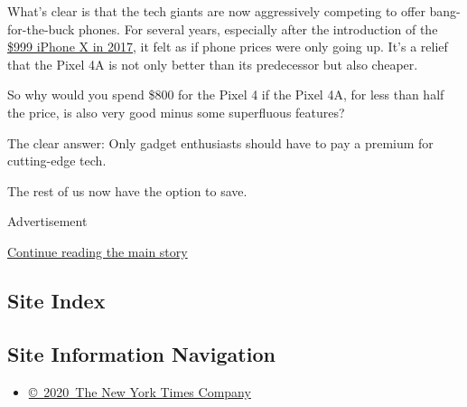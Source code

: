 What's clear is that the tech giants are now aggressively competing to
offer bang-for-the-buck phones. For several years, especially after the
introduction of the
\href{https://www.nytimes3xbfgragh.onion/2017/11/01/technology/personaltech/apple-iphone-x-review.html}{\$999
iPhone X in 2017}, it felt as if phone prices were only going up. It's a
relief that the Pixel 4A is not only better than its predecessor but
also cheaper.

So why would you spend \$800 for the Pixel 4 if the Pixel 4A, for less
than half the price, is also very good minus some superfluous features?

The clear answer: Only gadget enthusiasts should have to pay a premium
for cutting-edge tech.

The rest of us now have the option to save.

Advertisement

\protect\hyperlink{after-bottom}{Continue reading the main story}

\hypertarget{site-index}{%
\subsection{Site Index}\label{site-index}}

\hypertarget{site-information-navigation}{%
\subsection{Site Information
Navigation}\label{site-information-navigation}}

\begin{itemize}
\tightlist
\item
  \href{https://help.nytimes3xbfgragh.onion/hc/en-us/articles/115014792127-Copyright-notice}{©~2020~The
  New York Times Company}
\end{itemize}

